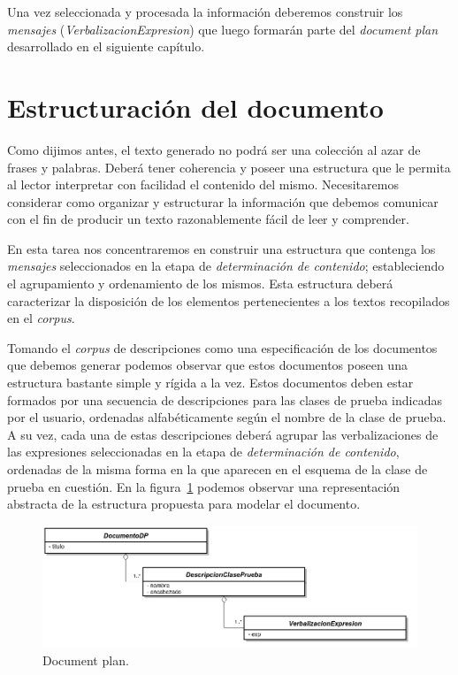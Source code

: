 \bigskip
Una vez seleccionada y procesada la información deberemos construir los \emph{mensajes} (\emph{VerbalizacionExpresion}) que luego formarán parte del \emph{document plan} desarrollado en el siguiente capítulo.

\section{Estructuración del documento}

Como dijimos antes, el texto generado no podrá ser una colección al azar de frases y palabras. Deberá tener coherencia y poseer una estructura que le permita al lector interpretar con facilidad el contenido del mismo.
Necesitaremos considerar como organizar y estructurar la información que debemos comunicar con el fin de producir un texto razonablemente fácil de leer y comprender.

En esta tarea nos concentraremos en construir una estructura que contenga los \emph{mensajes} seleccionados en la etapa de \emph{determinación de contenido}; estableciendo el agrupamiento y ordenamiento de los mismos. Esta estructura deberá caracterizar la disposición de los elementos pertenecientes a los textos recopilados en el \emph{corpus}. 

Tomando el \emph{corpus} de descripciones como una especificación de los documentos que debemos generar podemos observar que estos documentos poseen una estructura bastante simple y rígida a la vez. Estos documentos deben estar formados por una secuencia de descripciones para las clases de prueba indicadas por el usuario, ordenadas alfabéticamente según el nombre de la clase de prueba. A su vez, cada una de estas descripciones deberá agrupar las verbalizaciones de las expresiones seleccionadas en la etapa de \emph{determinación de contenido}, ordenadas de la misma forma en la que aparecen en el esquema de la clase de prueba en cuestión. En la figura~\ref{fig:png_document_plan} podemos observar una representación abstracta de la estructura propuesta para modelar el documento.

\begin{figure}[H]
  	\centering
	\includegraphics[scale=0.4]{img/document_plan.png}
	\caption{Document plan.}
  	\label{fig:png_document_plan}
\end{figure}

